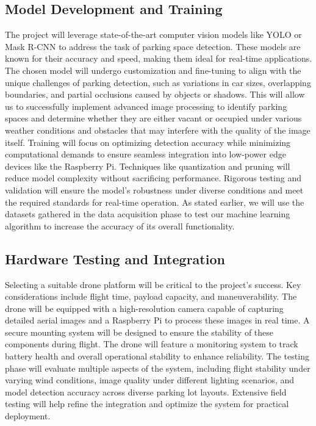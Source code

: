 \documentclass[conference]{IEEEtran}
\begin{document}
\subsection{Model Development and Training}

The project will leverage state-of-the-art computer vision models like YOLO or Mask R-CNN to address the task of parking space detection. 
These models are known for their accuracy and speed, 
making them ideal for real-time applications. 
The chosen model will undergo customization and fine-tuning to align with the unique challenges of parking detection, 
such as variations in car sizes, 
overlapping boundaries, 
and partial occlusions caused by objects or shadows. 
This will allow us to successfully implement advanced image processing to identify parking spaces and determine whether they are either vacant or occupied under various weather conditions and obstacles that may interfere with the quality of the image itself. 
Training will focus on optimizing detection accuracy while minimizing computational demands to ensure seamless integration into low-power edge devices like the Raspberry Pi. 
Techniques like quantization and pruning will reduce model complexity without sacrificing performance. 
Rigorous testing and validation will ensure the model’s robustness under diverse conditions and meet the required standards for real-time operation. 
As stated earlier,
we will use the datasets gathered in the data acquisition phase to test our machine learning algorithm to increase the accuracy of its overall functionality.

\subsection{Hardware Testing and Integration}

Selecting a suitable drone platform will be critical to the project’s success. 
Key considerations include flight time, 
payload capacity, 
and maneuverability. 
The drone will be equipped with a high-resolution camera capable of capturing detailed aerial images and a Raspberry Pi to process these images in real time. 
A secure mounting system will be designed to ensure the stability of these components during flight. 
The drone will feature a monitoring system to track battery health and overall operational stability to enhance reliability. 
The testing phase will evaluate multiple aspects of the system, 
including flight stability under varying wind conditions, 
image quality under different lighting scenarios, 
and model detection accuracy across diverse parking lot layouts. 
Extensive field testing will help refine the integration and optimize the system for practical deployment.
\end{document}
